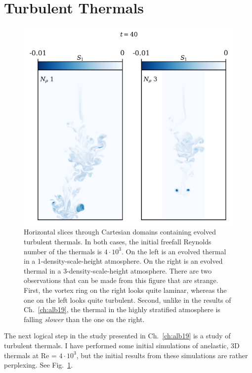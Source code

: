 \section{Turbulent Thermals}
\label{sec:turb_thermals}
\begin{figure}[p!]
    \includegraphics[width=\textwidth]{figs/unpublished/turbulent_thermals.pdf}
    \caption[Evolved turbulent thermals]{
	Horizontal slices through Cartesian domains containing evolved turbulent thermals.
	In both cases, the initial freefall Reynolds number of the thermals is $4\cdot10^3$.
	On the left is an evolved thermal in a 1-density-scale-height atmosphere.
	On the right is an evolved thermal in a 3-density-scale-height atmosphere.
	There are two observations that can be made from this figure that are strange.
	First, the vortex ring on the right looks quite laminar, whereas the one on the left looks quite turbulent.
	Second, unlike in the results of Ch.~\ref{ch:alb19}, the thermal in the highly stratified atmosphere is falling \emph{slower} than the one on the right.
    \label{fig:turbulent_thermals} }
\end{figure}


The next logical step in the study presented in Ch.~\ref{ch:alb19} is a study of turbulent thermals.
I have performed some initial simulations of anelastic, 3D thermals at Re = $4 \cdot 10^3$, but the initial results from these simulations are rather perplexing.
See Fig.~\ref{fig:turbulent_thermals}.

